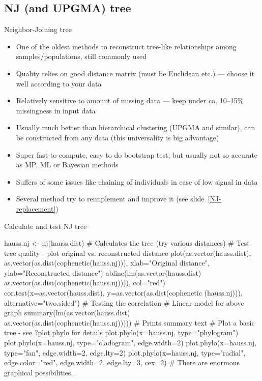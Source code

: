 \documentclass[compress, xelatex, 11pt, xcolor=svgnames, aspectratio=169,
	hyperref={
		bookmarks=true,
		unicode=true,
		colorlinks=true,
		pdftitle={Molecular data in R},
		plainpages=false,
		pdfauthor={Vojtech Zeisek},
		pdfsubject={Course about phylogeny and evolution in R},
		pdfcreator={XeLaTeX},
		pdfkeywords={R, evolution, phylogeny, molecular data},
		linkcolor=Crimson, %
		anchorcolor=Magenta, %
		citecolor=Magenta, %
		filecolor=Magenta, %
		menucolor=Magenta, %
		urlcolor=DodgerBlue, %
		},
	url={hyphens, lowtilde} %
	]{beamer}
\begin{document}
\subsection{NJ (and UPGMA) tree}

\begin{frame}{Neighbor-Joining tree}
	\label{NJ}
	\begin{itemize}
		\item One of the oldest methods to reconstruct tree-like relationships among samples/populations, still commonly used
		\item Quality relies on good distance matrix (must be Euclidean etc.) --- choose it well according to your data
		\item Relatively sensitive to amount of missing data --- keep under ca. 10--15\% missingness in input data
		\item Usually much better than hierarchical clustering (UPGMA and similar), can be constructed from any data (this universality is big advantage)
		\item Super fast to compute, easy to do bootstrap test, but usually not so accurate as MP, ML or Bayesian methods
		\item Suffers of some issues like chaining of individuals in case of low signal in data
		\item Several method try to reimplement and improve it (see slide~\ref{NJ-replacement})
	\end{itemize}
\end{frame}

\begin{frame}[fragile]{Calculate and test NJ tree}
	\begin{spluscode}
    hauss.nj <- nj(hauss.dist) # Calculates the tree (try various distances)
    # Test tree quality - plot original vs. reconstructed distance
    plot(as.vector(hauss.dist), as.vector(as.dist(cophenetic(hauss.nj))),
      xlab="Original distance", ylab="Reconstructed distance")
    abline(lm(as.vector(hauss.dist) ~
      as.vector(as.dist(cophenetic(hauss.nj)))), col="red")
    cor.test(x=as.vector(hauss.dist), y=as.vector(as.dist(cophenetic
      (hauss.nj))), alternative="two.sided") # Testing the correlation
    # Linear model for above graph
    summary(lm(as.vector(hauss.dist) ~
      as.vector(as.dist(cophenetic(hauss.nj))))) # Prints summary text
    # Plot a basic tree - see ?plot.phylo for details
    plot.phylo(x=hauss.nj, type="phylogram")
    plot.phylo(x=hauss.nj, type="cladogram", edge.width=2)
    plot.phylo(x=hauss.nj, type="fan", edge.width=2, edge.lty=2)
    plot.phylo(x=hauss.nj, type="radial", edge.color="red", edge.width=2,
      edge.lty=3, cex=2) # There are enormous graphical possibilities...
	\end{spluscode}
\end{frame}
\end{document}
